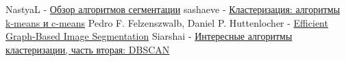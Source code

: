 \documentclass[a4paper, 14pt]{article}
\begin{document}
\begin{thebibliography}{}
	  NastyaL  -  \href{https://habr.com/ru/company/intel/blog/266347/}{Обзор алгоритмов сегментации}
	 sashaeve - 
	 \href{https://habr.com/ru/post/67078/}{Кластеризация: алгоритмы k-means и c-means}
	  Pedro F. Felzenszwalb, Daniel P. Huttenlocher  -  
	\href{https://people.cs.uchicago.edu/~pff/papers/seg-ijcv.pdf}{Efficient Graph-Based Image Segmentation}
	 Siarshai
	 - \href{https://habr.com/ru/post/322034/}{Интересные алгоритмы кластеризации, часть вторая: DBSCAN}
\end{thebibliography}
	



	
\end{document}
